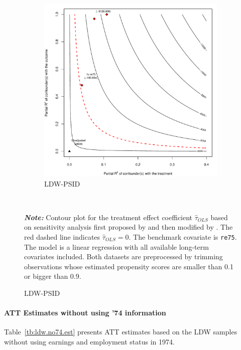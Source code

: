 \documentclass[letterpaper,12pt,leqno]{article}
\begin{document}
\begin{figure}[!ht]
\begin{minipage}[c]{1\textwidth}
\begin{subfigure}{0.45\linewidth}
            \includegraphics[width=\linewidth]{sens_ldw_psid.pdf}
            \caption{LDW-PSID}
        \end{subfigure}
    \end{minipage}%
    \\\raggedright
     {\footnotesize\textbf{\textit{Note:}} Contour plot for the treatment effect coefficient $\hat{\tau}_{OLS}$ based on sensitivity analysis first proposed by \citet{imbens2003} and then modified by \citet{cinelli2020making}. The red dashed line indicates $\hat\tau_{OLS} = 0$. The benchmark covariate is \texttt{re75}. The model is a linear regression with all available long-term covariates included. Both datasets are preprocessed by trimming observations whose estimated propensity scores are smaller than 0.1 or bigger than 0.9.}
\end{figure}
\clearpage


\paragraph{ATT Estimates without using '74 information}

Table~\ref{tb:ldw.no74.est} presents ATT estimates based on the LDW samples without using earnings  and employment status in 1974.
\end{document}
